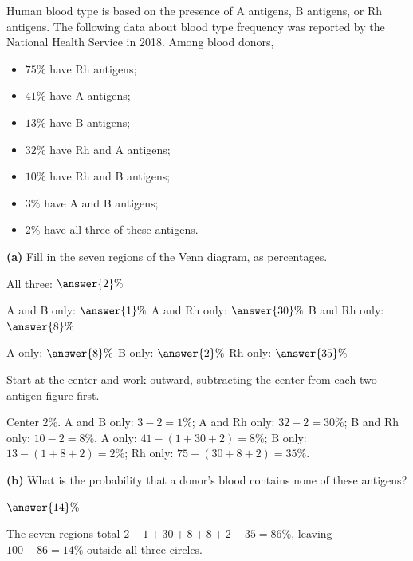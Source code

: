 \documentclass[12pt]{ximera}
\begin{document}
\begin{problem}
Human blood type is based on the presence of A antigens, B antigens, or Rh antigens.
The following data about blood type frequency was reported by the National Health
Service in 2018. Among blood donors,
\begin{itemize}
\item $75\%$ have Rh antigens;
\item $41\%$ have A antigens;
\item $13\%$ have B antigens;
\item $32\%$ have Rh and A antigens;
\item $10\%$ have Rh and B antigens;
\item $3\%$ have A and B antigens;
\item $2\%$ have all three of these antigens.
\end{itemize}

\begin{prompt}
\textbf{(a)} Fill in the seven regions of the Venn diagram, as percentages.

All three: $\answer{2}\%$

\smallskip
A and B only: $\answer{1}\%$ \qquad A and Rh only: $\answer{30}\%$ \qquad
B and Rh only: $\answer{8}\%$

\smallskip
A only: $\answer{8}\%$ \qquad B only: $\answer{2}\%$ \qquad Rh only: $\answer{35}\%$

\begin{hint}
Start at the center and work outward, subtracting the center from each two-antigen
figure first.
\end{hint}

\begin{feedback}
Center $2\%$. A and B only: $3-2=1\%$; A and Rh only: $32-2=30\%$; B and Rh only:
$10-2=8\%$. A only: $41-(1+30+2)=8\%$; B only: $13-(1+8+2)=2\%$; Rh only:
$75-(30+8+2)=35\%$.
\end{feedback}
\end{prompt}

\begin{prompt}
\textbf{(b)} What is the probability that a donor's blood contains none of these
antigens?

$\answer{14}\%$

\begin{feedback}
The seven regions total $2+1+30+8+8+2+35=86\%$, leaving $100-86=14\%$ outside all three
circles.
\end{feedback}
\end{prompt}


\end{problem}
\end{document}
